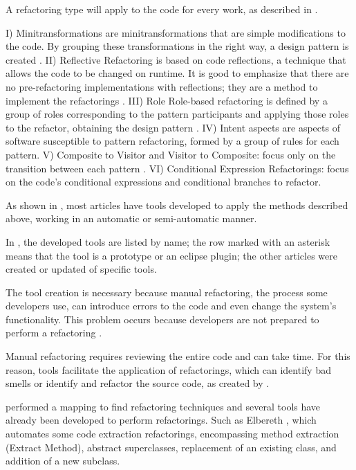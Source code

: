 A refactoring type will apply to the code for every work, as described in .

I) Minitransformations are minitransformations that are simple modifications to the code. By grouping these transformations in the right way, a design pattern is created \cite{cinneide2001automated}. II) Reflective Refactoring is based on code reflections, a technique that allows the code to be changed on runtime. It is good to emphasize that there are no pre-refactoring implementations with reflections; they are a method to implement the refactorings \cite{beluzzo2018abordagem}. III) Role Role-based refactoring is defined by a group of roles corresponding to the pattern participants and applying those roles to the refactor, obtaining the design pattern \cite{mens972774}. IV) Intent aspects are aspects of software susceptible to pattern refactoring, formed by a group of rules for each pattern\cite{ram2004detecting}. V) Composite to Visitor and Visitor to Composite: focus only on the transition between each pattern \cite{beluzzo2018abordagem}. VI) Conditional Expression Refactorings: focus on the code's conditional expressions and conditional branches to refactor. \cite{CHRISTOPOULOU20121201}

As shown in , most articles have tools developed to apply the methods described above, working in an automatic or semi-automatic manner.



In , the developed tools are listed by name; the row marked with an asterisk means that the tool is a prototype or an eclipse plugin; the other articles were created or updated of specific tools\cite{beluzzo2018abordagem}.

The tool creation is necessary because manual refactoring, the process some developers use, can introduce errors to the code and even change the system's functionality. This problem occurs because developers are not prepared to perform a refactoring \cite{ge2012reconciling}.

Manual refactoring requires reviewing the entire code and can take time. For this reason, tools facilitate the application of refactorings, which can identify bad smells or identify and refactor the source code, as created by \textcite{beluzzo2018abordagem}.

\textcite{beluzzo2018abordagem} performed a mapping to find refactoring techniques and several tools have already been developed to perform refactorings. Such as Elbereth \cite{korman1998elbereth}, which automates some code extraction refactorings, encompassing method extraction (Extract Method), abstract superclasses, replacement of an existing class, and addition of a new subclass.


